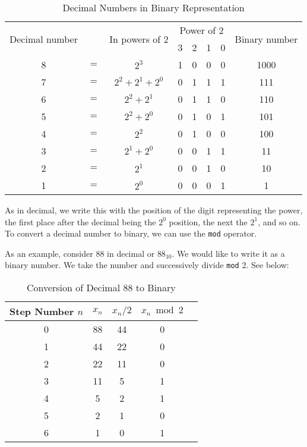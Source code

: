 \begin{table}[!ht]
\centering
\renewcommand{\arraystretch}{1.4}
\begin{tabular}{|c c c c c c c c|}
\hline 
\multirow{2}{*}{Decimal number} & & \multirow{2}{*}{In powers of 2} & \multicolumn{4}{c}{Power of 2} & \multirow{2}{*}{Binary number} \\
& & & 3 & 2 & 1 & 0 & \\ \hline
8 & $=$ & $2^3$ & 1 & 0 & 0 & 0 & 1000 \\
7 & $=$ & $2^2 + 2^1 + 2^0$ & 0 & 1 & 1 & 1 & 111 \\
6 & $=$ & $2^2 + 2^1$ & 0 & 1 & 1 & 0 & 110 \\
5 & $=$ & $2^2 + 2^0$ & 0 & 1 & 0 & 1 & 101 \\
4 & $=$ & $2^2$ & 0 & 1 & 0 & 0 & 100 \\
3 & $=$ & $2^1 + 2^0$ & 0 & 0 & 1 & 1 & 11 \\
2 & $=$ & $2^1$ & 0 & 0 & 1 & 0 & 10 \\
1 & $=$ & $2^0$ & 0 & 0 & 0 & 1 & 1 \\ \hline
\end{tabular}
\caption{Decimal Numbers in Binary Representation}
\end{table}

As in decimal, we write this with the position of the digit representing the power, the first place after the decimal being the $2^0$ position, the next the $2^1$, and so on. To convert a decimal number to binary, we can use the \texttt{mod} operator.

As an example, consider 88 in decimal or $88_{10}$. We would like to write it as a binary number. We take the number and successively divide \texttt{mod} 2. See below:

\begin{table}[h!]
\centering
\renewcommand{\arraystretch}{1.4}
\begin{tabular}{|c|c|c|c|c|}
\hline 
Step Number $n$ & $x_n$ & $x_n / 2$ & $x_n \bmod 2$ \\ \hline
0 & 88 & 44 & 0 \\ 
1 & 44 & 22 & 0 \\
2 & 22 & 11 & 0 \\
3 & 11 & 5 & 1 \\
4 & 5 & 2 & 1 \\
5 & 2 & 1 & 0 \\
6 & 1 & 0 & 1 \\ \hline
\end{tabular}
\caption{Conversion of Decimal 88 to Binary}
\end{table}

